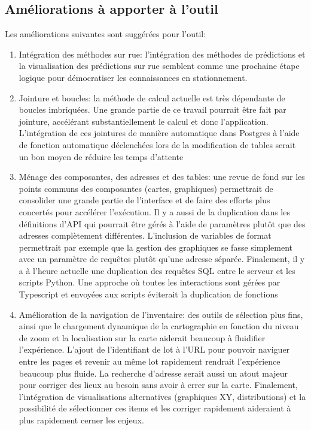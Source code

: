     \subsection{Améliorations à apporter à l'outil}
        Les améliorations suivantes sont suggérées pour l'outil:
        \begin{enumerate}
            \item Intégration des méthodes sur rue: l'intégration des méthodes de prédictions et la visualisation des prédictions sur rue semblent comme une prochaine étape logique pour démocratiser les connaissances en stationnement.
            \item Jointure et boucles: la méthode de calcul actuelle est très dépendante de boucles imbriquées. Une grande partie de ce travail pourrait être fait par jointure, accélérant substantiellement le calcul et donc l'application. L'intégration de ces jointures de manière automatique dans Postgres à l'aide de fonction automatique déclenchées lors de la modification de tables serait un bon moyen de réduire les temps d'attente
            \item Ménage des composantes, des adresses et des tables: une revue de fond sur les points communs des composantes (cartes, graphiques) permettrait de consolider une grande partie de l'interface et de faire des efforts plus concertés pour accélérer l'exécution. Il y a aussi de la duplication dans les définitions d'\ac{API} qui pourrait être gérés à l'aide de paramètres plutôt que des adresses complètement différentes. L'inclusion de variables de format permettrait par exemple que la gestion des graphiques se fasse simplement avec un paramètre de requêtes plutôt qu'une adresse séparée. Finalement, il y a à l'heure actuelle une duplication des requêtes SQL entre le serveur et les scripts Python. Une approche où toutes les interactions sont gérées par Typescript et envoyées aux scripts éviterait la duplication de fonctions
            \item Amélioration de la navigation de l'inventaire: des outils de sélection plus fins, ainsi que le chargement dynamique de la cartographie en fonction du niveau de zoom et la localisation sur la carte aiderait beaucoup à fluidifier l'expérience. L'ajout de l'identifiant de lot à l'URL pour pouvoir naviguer entre les pages et revenir au même lot rapidement rendrait l'expérience beaucoup plus fluide. La recherche d'adresse serait aussi un atout majeur pour corriger des lieux au besoin sans avoir à errer sur la carte. Finalement, l'intégration de visualisations alternatives (graphiques XY, distributions) et la possibilité de sélectionner ces items et les corriger rapidement aideraient à plus rapidement cerner les enjeux.

\end{enumerate}
